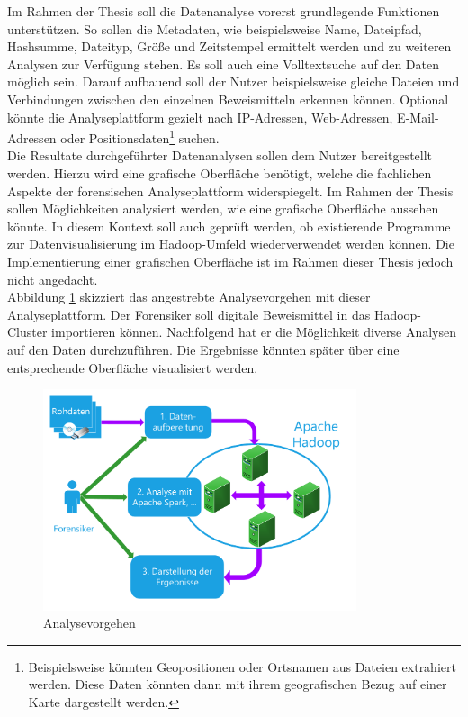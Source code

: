 \noindent
Im Rahmen der Thesis soll die Datenanalyse vorerst grundlegende Funktionen unterstützen.
So sollen die Metadaten, wie beispielsweise Name, Dateipfad, Hashsumme, Dateityp, Größe und Zeitstempel ermittelt werden und zu weiteren Analysen zur Verfügung stehen.
Es soll auch eine Volltextsuche auf den Daten möglich sein. Darauf aufbauend soll der Nutzer beispielsweise gleiche Dateien und Verbindungen zwischen den einzelnen Beweismitteln erkennen können.
Optional könnte die Analyseplattform gezielt nach IP-Adressen, Web-Adressen, E-Mail-Adressen oder Positionsdaten\footnote{Beispielsweise könnten Geopositionen oder Ortsnamen aus Dateien extrahiert werden. Diese Daten könnten dann mit ihrem geografischen Bezug auf einer Karte dargestellt werden.} suchen.\\

\noindent
Die Resultate durchgeführter Datenanalysen sollen dem Nutzer bereitgestellt werden. Hierzu
wird eine grafische Oberfläche benötigt, welche die fachlichen Aspekte der forensischen Analyseplattform widerspiegelt. Im Rahmen der Thesis sollen Möglichkeiten analysiert werden, wie eine grafische Oberfläche aussehen könnte. In diesem Kontext soll auch geprüft werden, ob existierende Programme zur Datenvisualisierung im Hadoop-Umfeld wiederverwendet werden können. Die Implementierung einer grafischen Oberfläche ist im Rahmen dieser Thesis jedoch nicht angedacht.\\

\noindent
Abbildung \ref{fig:foam_analysis_approach} skizziert das angestrebte Analysevorgehen mit dieser Analyseplattform. Der Forensiker soll digitale Beweismittel in das Hadoop-Cluster importieren können. Nachfolgend hat er die Möglichkeit diverse Analysen auf den Daten durchzuführen. Die Ergebnisse könnten später über eine entsprechende Oberfläche visualisiert werden.\\

\begin{figure}[ht]
  \centering
  \includegraphics[width=0.82\textwidth]{./resource/Hadoop-Struktur.pdf}
  \caption{Analysevorgehen}
  \label{fig:foam_analysis_approach}
\end{figure}

